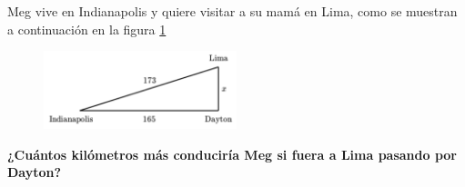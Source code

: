 \question[15]  Meg vive en Indianapolis y quiere visitar a su mamá en Lima,
como se muestran a continuación en la figura \ref{fig:proverb_pitagoras_07}
\begin{figure}[H]
    \begin{center}
        \includegraphics[width=0.5\textwidth]{../images/proverb_pitagoras_07}
    \end{center}
    \caption{}
    \label{fig:proverb_pitagoras_07}
\end{figure}
\textbf{¿Cuántos kilómetros más conduciría Meg si fuera a Lima pasando por Dayton?}
